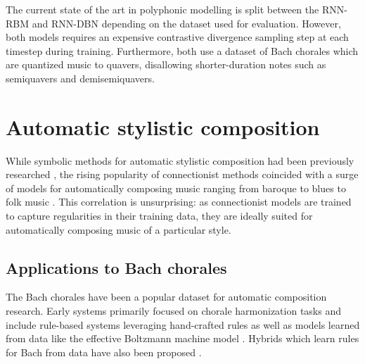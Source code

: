 
The current state of the art in polyphonic modelling is split between the
RNN-RBM \citep{Boulanger-Lewandowski2012} and RNN-DBN
\citep{goel2014polyphonic} depending on the dataset used for evaluation.
However, both models requires an expensive contrastive divergence sampling step
at each timestep during training. Furthermore, both use a dataset of Bach
chorales which are quantized music to quavers, disallowing shorter-duration
notes such as semiquavers and demisemiquavers.



\section{Automatic stylistic composition}

While symbolic methods for automatic stylistic composition had been previously
researched \citep{cruz1998learning,chuan2007hybrid}, the rising popularity of
connectionist methods coincided with a surge of models for automatically
composing music ranging from baroque \citep{hornel1997melonet} to blues
\citep{Eck2002-blues} to folk music \citep{sturm2015folk}. This correlation is
unsurprising: as connectionist models are trained to capture regularities in
their training data, they are ideally suited for automatically composing music
of a particular style.

\subsection{Applications to Bach chorales}

The Bach chorales have been a popular dataset for automatic composition
research. Early systems primarily focused on chorale harmonization tasks and
include rule-based systems leveraging hand-crafted rules
\citep{ebciouglu1988expert} as well as models learned from data like the
effective Boltzmann machine model \citep{bellgard1994harmonizing}. Hybrids
which learn rules for Bach from data have also been proposed
\citep{spangler1998bach}.

